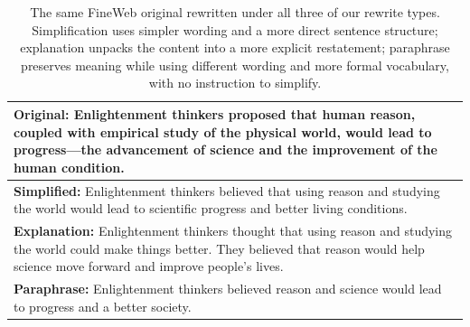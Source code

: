 \documentclass[11pt]{article}
\begin{document}
\begin{table}[t]
\centering
\small
\begin{tabular}{p{}}
\toprule
\textbf{Original:} Enlightenment thinkers proposed that human reason, coupled with empirical study of the physical world, would lead to progress---the advancement of science and the improvement of the human condition. \\
\midrule
\textbf{Simplified:} Enlightenment thinkers believed that using reason and studying the world would lead to scientific progress and better living conditions. \\
\textbf{Explanation:} Enlightenment thinkers thought that using reason and studying the world could make things better. They believed that reason would help science move forward and improve people's lives. \\
\textbf{Paraphrase:} Enlightenment thinkers believed reason and science would lead to progress and a better society. \\
\bottomrule
\end{tabular}
\caption{The same FineWeb original rewritten under all three of our rewrite types. Simplification uses simpler wording and a more direct sentence structure; explanation unpacks the content into a more explicit restatement; paraphrase preserves meaning while using different wording and more formal vocabulary, with no instruction to simplify.}
\label{tab:rewrite-examples}
\end{table}

\begin{table}[t]
\centering
\small
{}
\caption{Difficulty metrics for original vs.\ simplified text, computed over each source's pairs (OpenStax and BCCampus pooled together). Ratio and Lex.\,Ov.\ compare the simplified sentence to its original; FRE, FKGL, DaleC, and DiffWd are reported separately for the original and the simplified side of each pair. Higher FRE is easier; lower FKGL, DaleC, and DiffWd are easier. Bold marks the easier side for each readability metric.}
\label{tab:difficulty-by-source}
\end{table}
\end{document}
